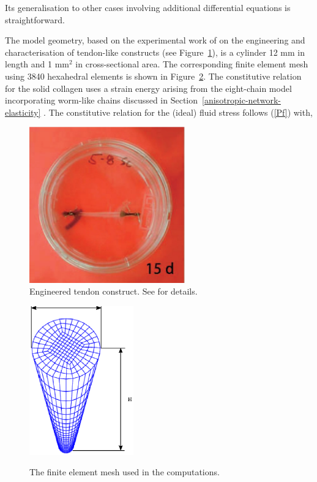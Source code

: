 \noindent Its generalisation to other cases involving additional differential
equations is straightforward.

The model geometry, based on the experimental work of \citet{Calve:04}
on the engineering and characterisation of tendon-like constructs (see
Figure~\ref{engconst}), is a cylinder 12 mm in length and 1 mm$^2$ in
cross-sectional area. The corresponding finite element mesh using 3840
hexahedral elements is shown in Figure~\ref{egmesh}. The constitutive
relation for the solid collagen uses a strain energy arising from the
eight-chain model incorporating worm-like chains discussed in
Section~\ref{anisotropic-network-elasticity} . The constitutive
relation for the (ideal) fluid stress follows (\ref{Pf}) with,

\begin{figure}[ht]
\centering
  \includegraphics[width=0.6\textwidth]{images/experiments/one-construct}
\caption{Engineered tendon construct. See \citet{Calve:04} for
  details.} 
\label{engconst}
\end{figure}

\begin{figure}[ht]
  \centering
  {\includegraphics[width=0.4\textwidth]{images/examples/lagrangian/mesh}}
  \caption{The finite element mesh used in the computations.}
  \label{egmesh}
\end{figure}

